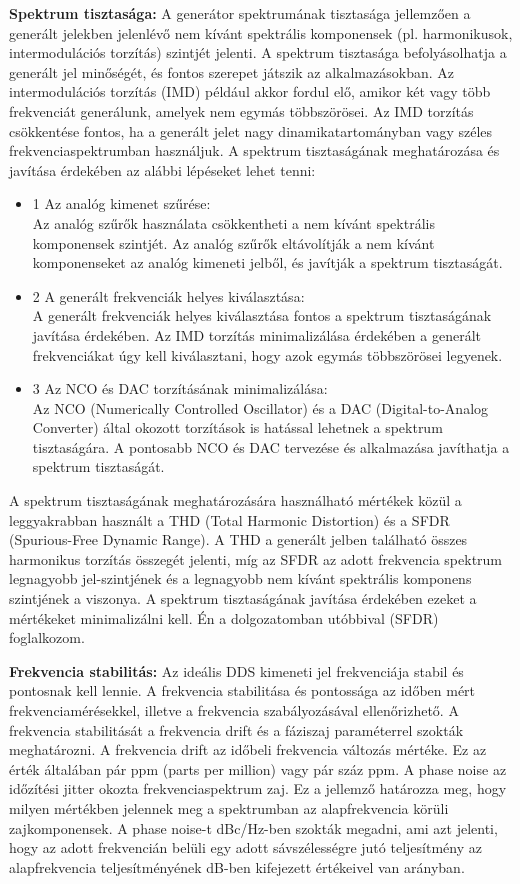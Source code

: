 \documentclass[a4paper,12pt]{article}
\begin{document}
			\textbf{Spektrum tisztasága:} A generátor spektrumának tisztasága jellemzően a generált jelekben jelenlévő nem kívánt spektrális komponensek (pl. harmonikusok, intermodulációs torzítás) szintjét jelenti.
			A spektrum tisztasága befolyásolhatja a generált jel minőségét, és fontos szerepet játszik az alkalmazásokban. Az intermodulációs torzítás (IMD) például akkor fordul elő, amikor két vagy több frekvenciát generálunk, amelyek nem egymás többszörösei. Az IMD torzítás csökkentése fontos, ha a generált jelet nagy dinamikatartományban vagy széles frekvenciaspektrumban használjuk.
			A spektrum tisztaságának meghatározása és javítása érdekében az alábbi lépéseket lehet tenni:
			\begin{itemize}
				\item{1} Az analóg kimenet szűrése:\\
				Az analóg szűrők használata csökkentheti a nem kívánt spektrális komponensek szintjét. Az analóg szűrők eltávolítják a nem kívánt komponenseket az analóg kimeneti jelből, és javítják a spektrum tisztaságát.
				\item{2} A generált frekvenciák helyes kiválasztása:\\
				A generált frekvenciák helyes kiválasztása fontos a spektrum tisztaságának javítása érdekében. Az IMD torzítás minimalizálása érdekében a generált frekvenciákat úgy kell kiválasztani, hogy azok egymás többszörösei legyenek.
				\item{3} Az NCO és DAC torzításának minimalizálása:\\
				Az NCO (Numerically Controlled Oscillator) és a DAC (Digital-to-Analog Converter) által okozott torzítások is hatással lehetnek a spektrum tisztaságára. A pontosabb NCO és DAC tervezése és alkalmazása javíthatja a spektrum tisztaságát.
			\end{itemize}
			A spektrum tisztaságának meghatározására használható mértékek közül a leggyakrabban használt a THD (Total Harmonic Distortion) és a SFDR (Spurious-Free Dynamic Range). A THD a generált jelben található összes harmonikus torzítás összegét jelenti, míg az SFDR az adott frekvencia spektrum legnagyobb jel-szintjének és a legnagyobb nem kívánt spektrális komponens szintjének a viszonya. A spektrum tisztaságának javítása érdekében ezeket a mértékeket minimalizálni kell. Én a dolgozatomban utóbbival (SFDR) foglalkozom.
			
			\textbf{Frekvencia stabilitás:} Az ideális DDS kimeneti jel frekvenciája stabil és pontosnak kell lennie. A frekvencia stabilitása és pontossága az időben mért frekvenciamérésekkel, illetve a frekvencia szabályozásával ellenőrizhető. 
			A frekvencia stabilitását a frekvencia drift és a fáziszaj paraméterrel szokták meghatározni.
			A frekvencia drift az időbeli frekvencia változás mértéke. Ez az érték általában pár ppm (parts per million) vagy pár száz ppm.
			A phase noise az időzítési jitter okozta frekvenciaspektrum zaj. Ez a jellemző határozza meg, hogy milyen mértékben jelennek meg a spektrumban az alapfrekvencia körüli zajkomponensek. A phase noise-t dBc/Hz-ben szokták megadni, ami azt jelenti, hogy az adott frekvencián belüli egy adott sávszélességre jutó teljesítmény az alapfrekvencia teljesítményének dB-ben kifejezett értékeivel van arányban.
					
\end{document}
